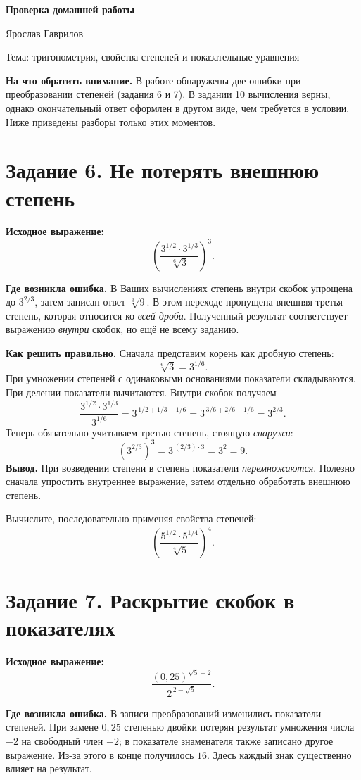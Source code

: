 \documentclass[12pt,a4paper]{article}
\newcommand{\Step}[1]{\par\textbf{#1}\quad}
\begin{document}
{\Large\bfseries\color{ink}Проверка домашней работы}\par
{\large Ярослав Гаврилов}\par
{\small\color{muted}Тема: тригонометрия, свойства степеней и показательные уравнения}\par
\vspace{2mm}
\begin{tcolorbox}
\textbf{На что обратить внимание.} В работе обнаружены две ошибки при преобразовании степеней (задания 6 и 7). В задании 10 вычисления верны, однако окончательный ответ оформлен в другом виде, чем требуется в условии. Ниже приведены разборы только этих моментов.
\end{tcolorbox}

\section*{Задание 6. Не потерять внешнюю степень}
\textbf{Исходное выражение:}
\[
\left(\frac{3^{1/2}\cdot 3^{1/3}}{\sqrt[6]{3}}\right)^3.
\]
\Step{Где возникла ошибка.} В Ваших вычислениях степень внутри скобок упрощена до \(3^{2/3}\), затем записан ответ \(\sqrt[3]{9}\). В этом переходе пропущена внешняя третья степень, которая относится ко \emph{всей дроби}. Полученный результат соответствует выражению \emph{внутри} скобок, но ещё не всему заданию.

\Step{Как решить правильно.} Сначала представим корень как дробную степень:
\[
\sqrt[6]{3}=3^{1/6}.
\]
При умножении степеней с одинаковыми основаниями показатели складываются. При делении показатели вычитаются. Внутри скобок получаем
\[
\frac{3^{1/2}\cdot3^{1/3}}{3^{1/6}}
=3^{\,1/2+1/3-1/6}
=3^{\,3/6+2/6-1/6}
=3^{2/3}.
\]
Теперь обязательно учитываем третью степень, стоящую \emph{снаружи}:
\[
\left(3^{2/3}\right)^3
=3^{\,(2/3)\cdot3}
=3^2=\boxed{9}.
\]
\textbf{Вывод.} При возведении степени в степень показатели \emph{перемножаются}. Полезно сначала упростить внутреннее выражение, затем отдельно обработать внешнюю степень.
\begin{practice}
Вычислите, последовательно применяя свойства степеней:
\[
\left(\frac{5^{1/2}\cdot5^{1/4}}{\sqrt[4]{5}}\right)^4.
\]
\end{practice}

\section*{Задание 7. Раскрытие скобок в показателях}
\textbf{Исходное выражение:}
\[
\frac{(0{,}25)^{\sqrt5-2}}{2^{\,2-\sqrt5}}.
\]
\Step{Где возникла ошибка.} В записи преобразований изменились показатели степеней. При замене \(0{,}25\) степенью двойки потерян результат умножения числа \(-2\) на свободный член \(-2\); в показателе знаменателя также записано другое выражение. Из-за этого в конце получилось \(16\). Здесь каждый знак существенно влияет на результат.
\end{document}

